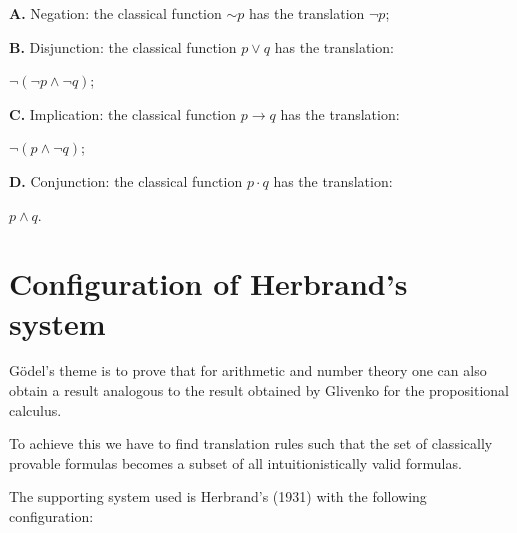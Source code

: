 \documentclass[12pt]{article}
\begin{document}
\begin{enumerate}
\textbf{A.} Negation: the classical function $\sim p$ has the translation $\neg p$;

\textbf{B.} Disjunction: the classical function $p \vee q$ has the translation:

\begin{center}
$\neg (\neg p \wedge \neg q)$;
\end{center}

\textbf{C.} Implication: the classical function $p \rightarrow q$ has the translation:

\begin{center}
$\neg (p \wedge \neg q)$;
\end{center}

\textbf{D.} Conjunction: the classical function $p \cdot q$ has the translation:

\begin{center}
$p \wedge q$.
\end{center}

\end{enumerate}

\section{Configuration of Herbrand's system}\normalsize

G\"{o}del's theme is to prove that for arithmetic and number theory one can also obtain a result analogous to the result obtained by Glivenko for the propositional calculus.

To achieve this we have to find translation rules such that the set of classically provable formulas becomes a subset of all intuitionistically valid formulas.

The supporting system used is Herbrand's (1931) with the following configuration:
\end{document}
